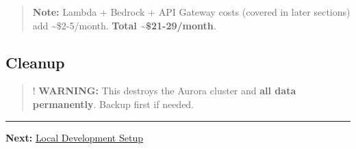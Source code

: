 \begin{quote}
\textbf{Note:} Lambda + Bedrock + API Gateway costs (covered in later
sections) add \textasciitilde\$2-5/month. \textbf{Total
\textasciitilde\$21-29/month}.
\end{quote}

\hypertarget{cleanup}{%
\subsection{Cleanup}}

\begin{Shaded}
\begin{Highlighting}[]
\end{Highlighting}
\end{Shaded}

\begin{quote}
! \textbf{WARNING:} This destroys the Aurora cluster and \textbf{all
data permanently}. Backup first if needed.
\end{quote}

\begin{center}\rule{0.5\linewidth}{0.5pt}\end{center}

\textbf{Next:} \href{5.4-Local-Dev/}{Local Development Setup}
